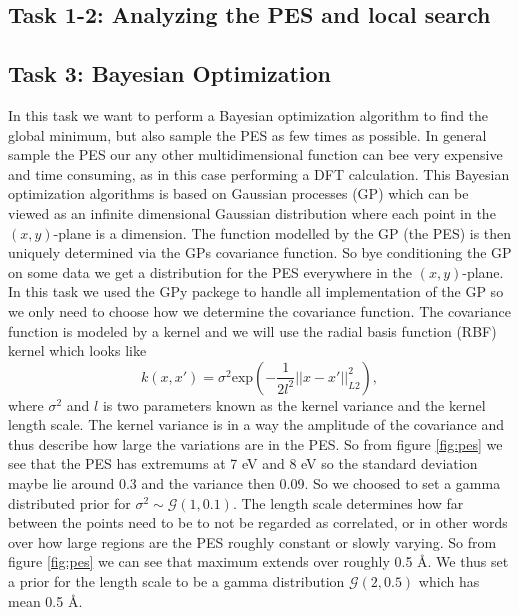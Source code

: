 \documentclass[11pt,a4paper]{article}
\begin{document}
\subsection[Task 1]{Task 1-2: Analyzing the PES and local search}
\label{sec:method_task12}

\subsection[Task 1]{Task 3: Bayesian Optimization}
\label{sec:method_task3}
In this task we want to perform a Bayesian optimization algorithm to find the global minimum, but also sample the PES as few times as possible. In general sample the PES our any other multidimensional function can bee very expensive and time consuming, as in this case performing a DFT calculation. This Bayesian optimization algorithms is based on Gaussian processes (GP) which can be viewed as an infinite dimensional Gaussian distribution where each point in the $(x,y)$-plane is a dimension. The function modelled  by the GP (the PES) is then uniquely determined via the GPs covariance function. So bye conditioning the GP on some data we get a distribution for the PES everywhere in the $(x,y)$-plane. In this task we used the GPy packege to handle all implementation of the GP so we only need to choose how we determine the covariance function. The covariance function is modeled by a kernel and we will use the radial basis function (RBF) kernel which looks like 
\begin{equation*}
    k(x, x') = \sigma^2 \text{exp}(-\frac{1}{2l^2}||x - x'||_{L2}^2),
\end{equation*}
where $\sigma^2$ and $l$ is two parameters known as the kernel variance and the kernel length scale. The kernel variance is in a way the amplitude of the covariance and thus describe how large the variations are in the PES. So from figure \ref{fig:pes} we see that the PES has extremums  at 7 eV and 8 eV so the standard deviation maybe lie around 0.3 and the variance then 0.09. So we choosed to set a gamma distributed prior for $\sigma^2 \sim \mathcal{G}(1,0.1)$. The length scale determines how far between the points need to be to not be regarded as correlated, or in other words over how large regions are the PES roughly constant or slowly varying. So from figure \ref{fig:pes} we can see that maximum extends over roughly 0.5 Å. We thus set a prior for the length scale to be a gamma distribution $\mathcal{G}(2,0.5)$ which has mean 0.5 Å.
\\
\end{document}
